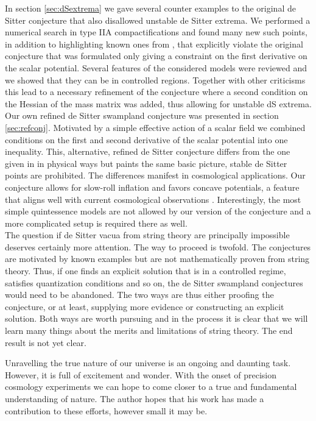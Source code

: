 \documentclass[a4paper,12pt]{report}
\begin{document}
In section \ref{sec:dSextrema} we gave several counter examples to the original de Sitter conjecture \cite{Roupec:2018mbn} that also disallowed unstable de Sitter extrema. We performed a numerical search in type IIA compactifications and found many new such points, in addition to highlighting known ones from \cite{Caviezel:2008tf,Flauger:2008ad}, that explicitly violate the original conjecture that was formulated only giving a constraint on the first derivative on the scalar potential. Several features of the considered models were reviewed and we showed that they can be in controlled regions. Together with other criticisms this lead to a necessary refinement of the conjecture \cite{Ooguri:2018wrx} where a second condition on the Hessian of the mass matrix was added, thus allowing for unstable dS extrema.\\
Our own refined de Sitter swampland conjecture \cite{Andriot:2018mav} was presented in section \ref{sec:refconj}. Motivated by a simple effective action of a scalar field we combined conditions on the first and second derivative of the scalar potential into one inequality. This, alternative, refined de Sitter conjecture differs from the one given in \cite{Ooguri:2018wrx} in physical ways but paints the same basic picture, stable de Sitter points are prohibited. The differences manifest in cosmological applications. Our conjecture allows for slow-roll inflation and favors concave potentials, a feature that aligns well with current cosmological observations \cite{Planck:2018jri}. Interestingly, the most simple quintessence models are not allowed by our version of the conjecture and a more complicated setup is required there as well.\\
The question if de Sitter vacua from string theory are principally impossible deserves certainly more attention. The way to proceed is twofold. The conjectures are motivated by known examples but are not mathematically proven from string theory. Thus, if one finds an explicit solution that is in a controlled regime, satisfies quantization conditions and so on, the de Sitter swampland conjectures would need to be abandoned. The two ways are thus either proofing the conjecture, or at least, supplying more evidence or constructing an explicit solution. Both ways are worth pursuing and in the process it is clear that we will learn many things about the merits and limitations of string theory. The end result is not yet clear.

\vspace{12pt}
Unravelling the true nature of our universe is an ongoing and daunting task. However, it is full of excitement and wonder. With the onset of precision cosmology experiments we can hope to come closer to a true and fundamental understanding of nature. The author hopes that his work has made a contribution to these efforts, however small it may be.
\end{document}
